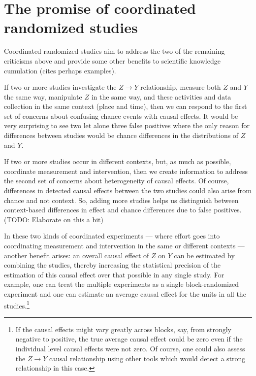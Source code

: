 \documentclass[
  11pt,
]{article}
\begin{document}
\hypertarget{the-promise-of-coordinated-randomized-studies}{%
\section{The promise of coordinated randomized
studies}\label{the-promise-of-coordinated-randomized-studies}}

Coordinated randomized studies aim to address the two of the remaining
criticisms above and provide some other benefits to scientific knowledge
cumulation (cites perhaps examples).

If two or more studies investigate the \(Z \rightarrow Y\) relationship,
measure both \(Z\) and \(Y\) the same way, manipulate \(Z\) in the same
way, and these activities and data collection in the same context (place
and time), then we can respond to the first set of concerns about
confusing chance events with causal effects. It would be very surprising
to see two let alone three false positives where the only reason for
differences between studies would be chance differences in the
distributions of \(Z\) and \(Y\).

If two or more studies occur in different contexts, but, as much as
possible, coordinate measurement and intervention, then we create
information to address the second set of concerns about heterogeneity of
causal effects. Of course, differences in detected causal effects
between the two studies could also arise from chance and not context.
So, adding more studies helps us distinguish between context-based
differences in effect and chance differences due to false positives.
(TODO: Elaborate on this a bit)

In these two kinds of coordinated experiments --- where effort goes into
coordinating measurement and intervention in the same or different
contexts --- another benefit arises: an overall causal effect of \(Z\)
on \(Y\) can be estimated by combining the studies, thereby increasing
the statistical precision of the estimation of this causal effect over
that possible in any single study. For example, one can treat the
multiple experiments as a single block-randomized experiment and one can
estimate an average causal effect for the units in all the
studies.\footnote{If the causal effects might vary greatly across
  blocks, say, from strongly negative to positive, the true average
  causal effect could be zero even if the individual level causal
  effects were not zero. Of course, one could also assess the
  \(Z \rightarrow Y\) causal relationship using other tools which would
  detect a strong relationship in this case.}
\end{document}
